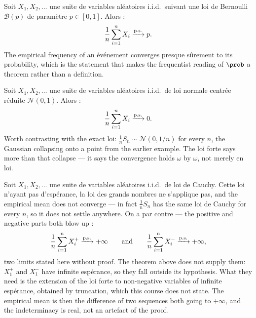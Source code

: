 \begin{example}
  Soit $X_{1}, X_{2}, \dots$ une suite de variables aléatoires i.i.d.\ suivant
  une loi de Bernoulli $\mathcal{B}(p)$ de paramètre
  $p \in [0,1]$. Alors :
  \[
    \frac{1}{n} \sum_{i=1}^{n} X_{i} \xrightarrow{\text{p.s.}} p .
  \]
  The empirical frequency of an événement converges presque sûrement to its
  probability, which is the statement that makes the frequentist reading of
  $\prob$ a theorem rather than a definition.
\end{example}

\begin{example}
  Soit $X_{1}, X_{2}, \dots$ une suite de variables aléatoires i.i.d.\ de loi
  normale centrée réduite $\mathcal{N}(0,1)$. Alors :
  \[
    \frac{1}{n} \sum_{i=1}^{n} X_{i} \xrightarrow{\text{p.s.}} 0 .
  \]
  Worth contrasting with the exact loi: $\frac{1}{n}S_{n} \sim
  \mathcal{N}(0, 1/n)$ for every $n$, the Gaussian collapsing onto a point from
  the earlier example. The loi forte says more than that collapse --- it says
  the convergence holds $\omega$ by $\omega$, not merely en loi.
\end{example}

\begin{example}
  Soit $X_{1}, X_{2}, \dots$ une suite de variables aléatoires i.i.d.\ de loi de
  Cauchy. Cette loi n'ayant pas d'espérance, la loi des grands nombres ne
  s'applique pas, and the empirical mean does not converge --- in fact
  $\frac{1}{n}S_{n}$ has the same loi de Cauchy for every $n$, so it does not
  settle anywhere. On a par contre --- the positive and negative parts both
  blow up :
  \[
    \frac{1}{n} \sum_{i=1}^{n} X_{i}^{+} \xrightarrow{\text{p.s.}} +\infty
    \qquad \text{and} \qquad
    \frac{1}{n} \sum_{i=1}^{n} X_{i}^{-} \xrightarrow{\text{p.s.}} +\infty ,
  \]
  two limits stated here without proof. The theorem above does not
  supply them: $X_{1}^{+}$ and $X_{1}^{-}$ have infinite espérance, so they
  fall outside its hypothesis. What they need is the extension of the loi forte
  to non-negative variables of infinite espérance, obtained by truncation,
  which this course does not state. The empirical mean is then the difference of
  two sequences both going to $+\infty$, and the indeterminacy is real, not an
  artefact of the proof.
\end{example}

